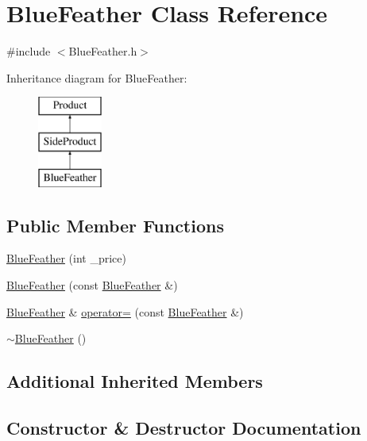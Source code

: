 \hypertarget{classBlueFeather}{}\section{Blue\+Feather Class Reference}
\label{classBlueFeather}


{\ttfamily \#include $<$Blue\+Feather.\+h$>$}

Inheritance diagram for Blue\+Feather\+:\begin{figure}[H]
\begin{center}
\leavevmode
\includegraphics[height=3.000000cm]{classBlueFeather}
\end{center}
\end{figure}
\subsection*{Public Member Functions}
\begin{DoxyCompactItemize}
\item 
\mbox{\hyperlink{classBlueFeather_a368fa47c8de60d2ed75fc8b68ec11be0}{Blue\+Feather}} (int \+\_\+price)
\item 
\mbox{\hyperlink{classBlueFeather_ab947fab3692927307631b9f211770a2b}{Blue\+Feather}} (const \mbox{\hyperlink{classBlueFeather}{Blue\+Feather}} \&)
\item 
\mbox{\hyperlink{classBlueFeather}{Blue\+Feather}} \& \mbox{\hyperlink{classBlueFeather_af30eff7845128300baf3117f5ba8bbf0}{operator=}} (const \mbox{\hyperlink{classBlueFeather}{Blue\+Feather}} \&)
\item 
\mbox{\hyperlink{classBlueFeather_a07d02fd11d800c9540a97de37a093ab3}{$\sim$\+Blue\+Feather}} ()
\end{DoxyCompactItemize}
\subsection*{Additional Inherited Members}


\subsection{Constructor \& Destructor Documentation}
\mbox{\label{classBlueFeather_a368fa47c8de60d2ed75fc8b68ec11be0}} 

